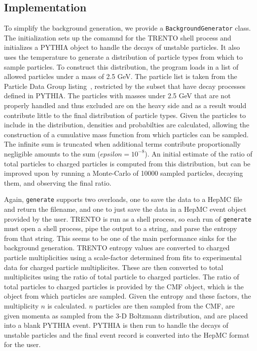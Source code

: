 \documentclass[11pt]{article}
\begin{document}
\subsection{Implementation}
To simplify the background generation, we provide a \texttt{BackgroundGenerator} class. The initialization sets up the comamnd for the TRENTO shell process and initializes a PYTHIA object to handle the decays of unstable particles. It also uses the temperature to generate a distribution of particle types from which to sample particles. To construct this distribution, the program loads in a list of allowed particles under a mass of 2.5 GeV. The particle list is taken from the Particle Data Group listing~\cite{Patrignani:2016xqp}, restricted by the subset that have decay processes defined in PYTHIA. The particles with masses under 2.5 GeV that are not properly handled and thus excluded are on the heavy side and as a result would contribute little to the final distribution of particle types. Given the particles to include in the distribution, densities and probabilties are calculated, allowing the construction of a cumulative mass function from which particles can be sampled. The infinite sum is truncated when additional terms contribute proportionally negligible amounts to the sum ($epsilon = 10^{-8}$). An initial estimate of the ratio of total particles to charged particles is computed from this distribution, but can be improved upon by running a Monte-Carlo of 10000 sampled particles, decaying them, and observing the final ratio.

Again, \texttt{generate} supports two overloads, one to save the data to a HepMC file and return the filename, and one to just save the data in a HepMC event object provided by the user. TRENTO is run as a shell process, so each run of \texttt{generate} must open a shell process, pipe the output to a string, and parse the entropy from that string. This seems to be one of the main performance sinks for the background generation. TRENTO entropy values are converted to charged particle multiplicities using a scale-factor determined from fits to experimental data for charged particle multiplicites. These are then converted to total multiplicites using the ratio of total particle to charged particles. The ratio of total particles to charged particles is provided by the CMF object, which is the object from which particles are sampled. Given the entropy and these factors, the multiplicity $n$ is calculated. $n$ particles are then sampled from the CMF, are given momenta as sampled from the 3-D Boltzmann distribution, and are placed into a blank PYTHIA event. PYTHIA is then run to handle the decays of unstable particles and the final event record is converted into the HepMC format for the user.
\end{document}
